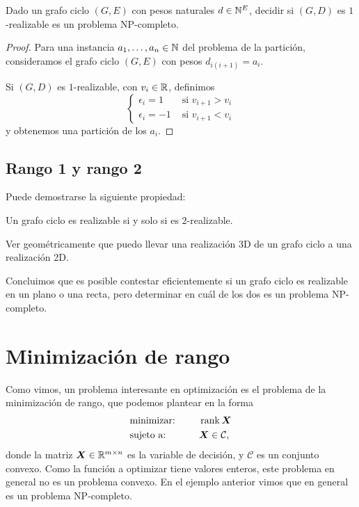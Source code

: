 \begin{theorem}
Dado un grafo ciclo $(G, E)$ con pesos naturales $d \in \mathbb{N}^E$, decidir si $(G,D)$ es $1$-realizable es un problema NP-completo.
\end{theorem}

\begin{proof}
Para una instancia $a_1, \dots, a_n \in \mathbb{N}$ del problema de la partición, consideramos el grafo ciclo $(G,E)$ con pesos $d_{i(i+1)} = a_i$.

Si $(G,D)$ es $1$-realizable, con $v_i \in \mathbb{R}$, definimos 
$$
\begin{cases}
\epsilon_i = 1 & \text{ si } v_{i+1} > v_i \\
\epsilon_i = -1 & \text{ si } v_{i+1} < v_i
\end{cases}
$$
y obtenemos una partición de los $a_i$.
\end{proof}

\subsection{Rango 1 y rango 2}

Puede demostrarse la siguiente propiedad:

\begin{center}
Un grafo ciclo es realizable si y solo si es $2$-realizable.
\end{center}

\begin{ejercicio} Ver geométricamente que puedo llevar una realización 3D de un grafo ciclo a una realización 2D.
\end{ejercicio}

Concluimos que es posible contestar eficientemente si un grafo ciclo es realizable en un plano o una recta, pero determinar en cuál de los dos es un problema NP-completo.

\section{Minimización de rango}

Como vimos, un problema interesante en optimización es el problema de la minimización de rango, que podemos plantear en la forma
\begin{alignat*}{2}
  & \text{minimizar: } & & \operatorname{rank} \bm{X}  \\
   & \text{sujeto a: } & \quad & \bm{X}  \in \mathcal{C},
\end{alignat*}
donde la matriz $\bm{X} \in \mathbb{R}^{m \times n}$ es la variable de decisión, y $\mathcal{C}$ es un conjunto convexo. Como la función a optimizar tiene valores enteros, este problema en general no es un problema convexo. En el ejemplo anterior vimos que en general es un problema NP-completo.

